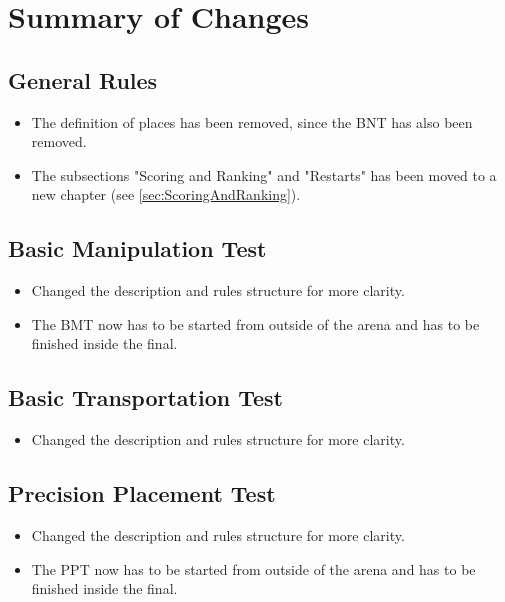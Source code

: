

\chapter{Summary of Changes}

\section{General Rules}
\begin{itemize}
  \item The definition of places has been removed, since the BNT has also been removed.
  \item The subsections "Scoring and Ranking" and "Restarts" has been moved to a new chapter (see \ref{sec:ScoringAndRanking}).
\end{itemize}


\section{Basic Manipulation Test} 
\begin{itemize}
  \item Changed the description and rules structure for more clarity.
  \item The BMT now has to be started from outside of the arena and has to be finished inside the final.
\end{itemize}

\section{Basic Transportation Test}
\begin{itemize}
  \item Changed the description and rules structure for more clarity.
\end{itemize}

\section{Precision Placement Test}
\begin{itemize}
  \item Changed the description and rules structure for more clarity.
  \item The PPT now has to be started from outside of the arena and has to be finished inside the final.
\end{itemize}

